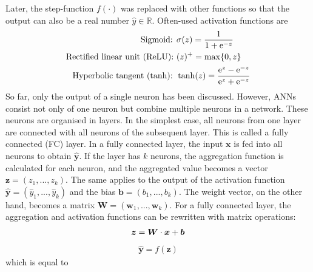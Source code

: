 %
Later, the step-function \(f(\cdot)\) was replaced with other functions so that the output can also be a real number \(\hat{y} \in \mathbb{R}\). Often-used activation functions are
%
\begin{align}\eqlbl{act_functions}%
	\begin{aligned}
		\text{Sigmoid: } & \sigma(z) = \frac{1}{1+\mathrm{e}^{-z}}\\
		\text{Rectified linear unit (ReLU): } & (z)^{+} = \max\{0, z\}\\
		\text{Hyperbolic tangent (tanh): }  & \tanh(z) = \frac{\mathrm{e}^{z}-\mathrm{e}^{-z}}{\mathrm{e}^{z}+\mathrm{e}^{-z}}
	\end{aligned}
\end{align}
%
So far, only the output of a single neuron has been discussed.
However, ANNs consist not only of one neuron but combine multiple neurons in a network. 
These neurons are organised in layers.
In the simplest case, all neurons from one layer are connected with all neurons of the subsequent layer. This is called a fully connected (FC) layer.
In a fully connected layer, the input $\boldsymbol{x}$ is fed into all neurons to obtain $\boldsymbol{\hat{y}}$.
If the layer has $k$ neurons, the aggregation function is calculated for each neuron, and the aggregated value becomes a vector $\boldsymbol{z} = (z_1, ..., z_k)$. The same applies to the output of the activation function $\boldsymbol{\hat{y}} = (\hat{y}_1, ..., \hat{y}_k)$ and the bias $\boldsymbol{b} = (b_1, ..., b_k)$. The weight vector, on the other hand, becomes a matrix $\boldsymbol{W} = (\boldsymbol{w}_1, ..., \boldsymbol{w}_k)$. For a fully connected layer, the aggregation and activation functions can be rewritten with matrix operations:
%
\begin{align}\eqlbl{nn3}%
	\boldsymbol{z} = \boldsymbol{W} \cdot \boldsymbol{x} + \boldsymbol{b}
\end{align}
\begin{align}
	\hat{\boldsymbol{y}} = f(\boldsymbol{z})
\end{align}
%
which is equal to
%
